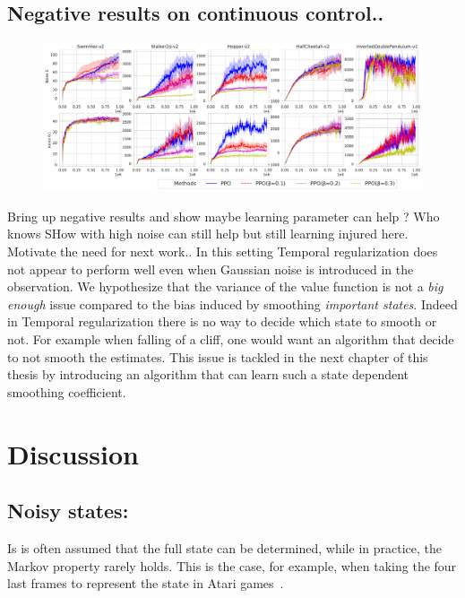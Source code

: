 \subsection{Negative results on continuous control..}
\begin{figure}
	\includegraphics[scale=0.4]{./fig/mujoco_temp_reg.pdf}
\end{figure}
Bring up negative results and show maybe learning parameter can help ? Who knows
SHow with high noise can still help but still learning injured here. Motivate the need for next work.. 
In this setting Temporal regularization does not appear to perform well even when Gaussian noise is introduced in the observation. We hypothesize that the variance of the value function is not a \emph{big enough} issue compared to the bias induced by smoothing \emph{important states}. Indeed in Temporal regularization there is no way to decide which state to smooth or not. For example when falling of a cliff, one would want an algorithm that decide to not smooth the estimates. This issue is tackled in the next chapter of this thesis by introducing an algorithm that can learn such a state dependent smoothing coefficient. 
\section{Discussion}

\subsection{Noisy states:}

Is is often assumed that the full state can be determined, while in practice, the Markov property rarely holds. This is the case, for example, when taking the four last frames to represent the state in Atari games~\citep{mnih2015human}. 


